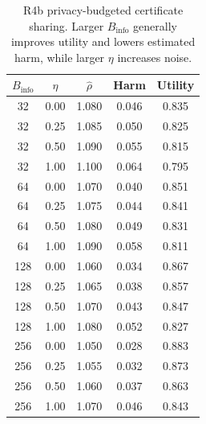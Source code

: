 \begin{table}[!ht]
\centering
\caption{\small R4b privacy-budgeted certificate sharing. Larger \(B_{\mathrm{info}}\) generally improves utility and lowers estimated harm, while larger \(\eta\) increases noise.}
\label{tab:r4_privacy}
\scriptsize
\begin{tabular}{ccccc}
\toprule
\(B_{\mathrm{info}}\) & \(\eta\) & \(\widehat\rho\) & Harm & Utility \\
\midrule
32 & 0.00 & 1.080 & 0.046 & 0.835 \\
32 & 0.25 & 1.085 & 0.050 & 0.825 \\
32 & 0.50 & 1.090 & 0.055 & 0.815 \\
32 & 1.00 & 1.100 & 0.064 & 0.795 \\
64 & 0.00 & 1.070 & 0.040 & 0.851 \\
64 & 0.25 & 1.075 & 0.044 & 0.841 \\
64 & 0.50 & 1.080 & 0.049 & 0.831 \\
64 & 1.00 & 1.090 & 0.058 & 0.811 \\
128 & 0.00 & 1.060 & 0.034 & 0.867 \\
128 & 0.25 & 1.065 & 0.038 & 0.857 \\
128 & 0.50 & 1.070 & 0.043 & 0.847 \\
128 & 1.00 & 1.080 & 0.052 & 0.827 \\
256 & 0.00 & 1.050 & 0.028 & 0.883 \\
256 & 0.25 & 1.055 & 0.032 & 0.873 \\
256 & 0.50 & 1.060 & 0.037 & 0.863 \\
256 & 1.00 & 1.070 & 0.046 & 0.843 \\
\bottomrule
\end{tabular}
\end{table}
